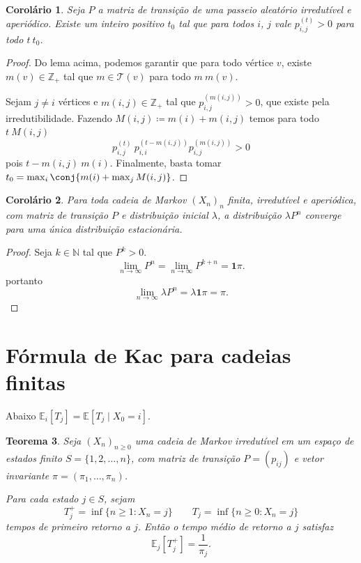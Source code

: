 \documentclass[12pt,letterpaper]{article}
\newtheorem{teorema} {Teorema}
\newtheorem{corolario} [teorema] {Corolário}
\def\Z{\mathbb Z}
\def\N{\mathbb N}
\begin{document}
\begin{corolario}\label{corol:aperiodicoirred}
  Seja $P$ a matriz de transição de uma passeio aleatório irredutível e
  aperiódico. Existe um inteiro positivo $t_0$ tal que para todos $i$,
  $j$ vale $p_{i,j}^{(t)}>0$ para todo $t\> t_0$.
\end{corolario}
\begin{proof}
  Do lema acima, podemos garantir que para todo vértice $v$, existe
  $m(v)\in\Z_+$ tal que $m\in \mathcal T(v)$ para todo $m \> m(v)$.
  
  Sejam $j\neq i$ vértices e $m(i,j)\in\Z_+$ tal que
  $p_{i,j}^{(m(i,j))}>0$, que existe pela irredutibilidade.  Fazendo
  $M(i,j) \coloneqq m(i)+m(i,j)$ temos para todo $t\> M(i,j)$
  \[
    p_{i,j}^{(t)}
    \>
    p_{i,i}^{(t-m(i,j))}  p_{i,j}^{(m(i,j))} > 0
  \]
  pois $t-m(i,j) \>  m(i)$. Finalmente, basta tomar
  $t_0 = \max_i\conj{m(i) + \max_{j} M(i,j)}$.
\end{proof}
\begin{corolario}
  Para toda cadeia de Markov $(X_n)_n$ finita, irredutível e
  aperiódica, com matriz de transição $P$ e distribuição inicial
  $\lambda$, a distribuição $\lambda P^n$ converge para uma única
  distribuição estacionária.
\end{corolario}
\begin{proof}
  Seja $k\in\N$ tal que $P^k>0$.
  $$
  \lim_{n\to \infty} P^n=
  \lim_{n\to \infty} P^{k+n}= \mathbf{1}\mathsf{\pi}.
  $$
  portanto
  $$\lim_{n\to \infty} \lambda P^n= \lambda \mathbf{1}\mathsf{\pi} =
  \mathsf{\pi}.$$
\end{proof}

\section{Fórmula de Kac para cadeias finitas}

Abaixo $ \mathbb{E}_i[T_j] =  \mathbb{E}[T_j\mid X_0=i]$.


\begin{teorema}
\label{teo:kac-finita}
Seja $(X_n)_{n \ge 0}$ uma cadeia de Markov irredutível em um espaço de
estados finito $S = \{1,2,\dots,n\}$, com matriz de transição
$P = (p_{ij})$ e vetor invariante $\mathsf{\pi} = (\pi_1,\dots,\pi_n)$.

Para cada estado $j \in S$, sejam 
\[
  T_j^+ = \inf\{n \ge 1 : X_n = j\}\qquad   T_j = \inf\{n \ge 0 : X_n = j\}
\]
tempos de \emph{primeiro retorno} a $j$.
Então o tempo médio de retorno a $j$ satisfaz 
\[
  \mathbb{E}_j[T_j^+] = \frac{1}{\pi_j}.
\]
\end{teorema}
\end{document}
